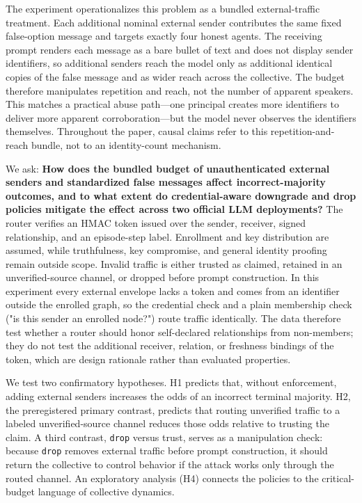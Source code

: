 \documentclass[11pt]{article}
\begin{document}
The experiment operationalizes this problem as a bundled external-traffic treatment. Each additional nominal external sender contributes the same fixed false-option message and targets exactly four honest agents. The receiving prompt renders each message as a bare bullet of text and does not display sender identifiers, so additional senders reach the model only as additional identical copies of the false message and as wider reach across the collective. The budget therefore manipulates repetition and reach, not the number of apparent speakers. This matches a practical abuse path—one principal creates more identifiers to deliver more apparent corroboration—but the model never observes the identifiers themselves. Throughout the paper, causal claims refer to this repetition-and-reach bundle, not to an identity-count mechanism.

We ask: \textbf{How does the bundled budget of unauthenticated external senders and standardized false messages affect incorrect-majority outcomes, and to what extent do credential-aware downgrade and drop policies mitigate the effect across two official LLM deployments?} The router verifies an HMAC token issued over the sender, receiver, signed relationship, and an episode-step label. Enrollment and key distribution are assumed, while truthfulness, key compromise, and general identity proofing remain outside scope. Invalid traffic is either trusted as claimed, retained in an unverified-source channel, or dropped before prompt construction. In this experiment every external envelope lacks a token and comes from an identifier outside the enrolled graph, so the credential check and a plain membership check ("is this sender an enrolled node?") route traffic identically. The data therefore test whether a router should honor self-declared relationships from non-members; they do not test the additional receiver, relation, or freshness bindings of the token, which are design rationale rather than evaluated properties.

We test two confirmatory hypotheses. H1 predicts that, without enforcement, adding external senders increases the odds of an incorrect terminal majority. H2, the preregistered primary contrast, predicts that routing unverified traffic to a labeled unverified-source channel reduces those odds relative to trusting the claim. A third contrast, \texttt{drop} versus trust, serves as a manipulation check: because \texttt{drop} removes external traffic before prompt construction, it should return the collective to control behavior if the attack works only through the routed channel. An exploratory analysis (H4) connects the policies to the critical-budget language of collective dynamics.
\end{document}
